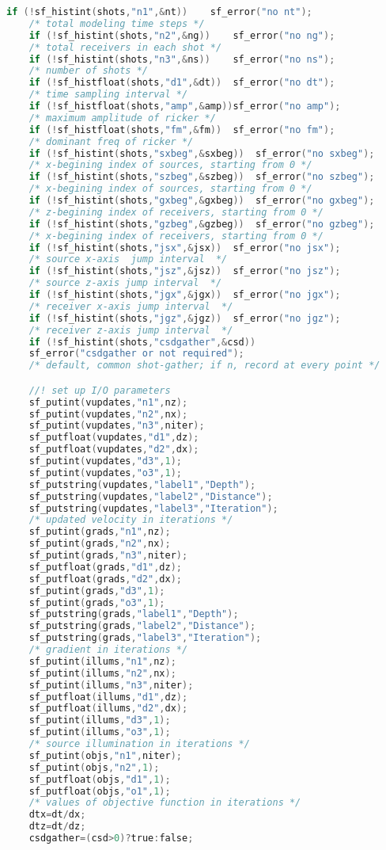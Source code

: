 \documentclass[a4paper,11pt]{article}
\theoremstyle{mytheor}
\begin{document}
\begin{lstlisting}[label={main},language=C,tabsize=4,caption=main()]
	if (!sf_histint(shots,"n1",&nt)) 	sf_error("no nt");
	/* total modeling time steps */
	if (!sf_histint(shots,"n2",&ng)) 	sf_error("no ng");
	/* total receivers in each shot */
	if (!sf_histint(shots,"n3",&ns)) 	sf_error("no ns");
	/* number of shots */
	if (!sf_histfloat(shots,"d1",&dt)) 	sf_error("no dt");
	/* time sampling interval */
	if (!sf_histfloat(shots,"amp",&amp))sf_error("no amp");
	/* maximum amplitude of ricker */
	if (!sf_histfloat(shots,"fm",&fm)) 	sf_error("no fm");
	/* dominant freq of ricker */
	if (!sf_histint(shots,"sxbeg",&sxbeg)) 	sf_error("no sxbeg");
	/* x-begining index of sources, starting from 0 */
	if (!sf_histint(shots,"szbeg",&szbeg)) 	sf_error("no szbeg");
	/* x-begining index of sources, starting from 0 */
	if (!sf_histint(shots,"gxbeg",&gxbeg)) 	sf_error("no gxbeg");
	/* z-begining index of receivers, starting from 0 */
	if (!sf_histint(shots,"gzbeg",&gzbeg)) 	sf_error("no gzbeg");
	/* x-begining index of receivers, starting from 0 */
	if (!sf_histint(shots,"jsx",&jsx)) 	sf_error("no jsx");
	/* source x-axis  jump interval  */
	if (!sf_histint(shots,"jsz",&jsz)) 	sf_error("no jsz");
	/* source z-axis jump interval  */
	if (!sf_histint(shots,"jgx",&jgx)) 	sf_error("no jgx");
	/* receiver x-axis jump interval  */
	if (!sf_histint(shots,"jgz",&jgz)) 	sf_error("no jgz");
	/* receiver z-axis jump interval  */
	if (!sf_histint(shots,"csdgather",&csd)) 	
	sf_error("csdgather or not required");
	/* default, common shot-gather; if n, record at every point */

	//! set up I/O parameters 
	sf_putint(vupdates,"n1",nz);	
	sf_putint(vupdates,"n2",nx);
	sf_putint(vupdates,"n3",niter);
	sf_putfloat(vupdates,"d1",dz);
	sf_putfloat(vupdates,"d2",dx);
	sf_putint(vupdates,"d3",1);
	sf_putint(vupdates,"o3",1);
	sf_putstring(vupdates,"label1","Depth");
	sf_putstring(vupdates,"label2","Distance");
	sf_putstring(vupdates,"label3","Iteration");
	/* updated velocity in iterations */
	sf_putint(grads,"n1",nz);	
	sf_putint(grads,"n2",nx);
	sf_putint(grads,"n3",niter);
	sf_putfloat(grads,"d1",dz);
	sf_putfloat(grads,"d2",dx);
	sf_putint(grads,"d3",1);
	sf_putint(grads,"o3",1);
	sf_putstring(grads,"label1","Depth");
	sf_putstring(grads,"label2","Distance");
	sf_putstring(grads,"label3","Iteration");
	/* gradient in iterations */
	sf_putint(illums,"n1",nz);	
	sf_putint(illums,"n2",nx);
	sf_putint(illums,"n3",niter);
	sf_putfloat(illums,"d1",dz);
	sf_putfloat(illums,"d2",dx);
	sf_putint(illums,"d3",1);
	sf_putint(illums,"o3",1);
	/* source illumination in iterations */
	sf_putint(objs,"n1",niter);
	sf_putint(objs,"n2",1);
	sf_putfloat(objs,"d1",1);
	sf_putfloat(objs,"o1",1);
	/* values of objective function in iterations */
	dtx=dt/dx; 
	dtz=dt/dz; 
	csdgather=(csd>0)?true:false;


\end{lstlisting}
\end{document}
